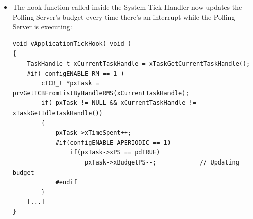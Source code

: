 \documentclass[10pt]{article}
\begin{document}
\begin{itemize}
\item The hook function called inside the System Tick Handler now updates the Polling Server's budget every time there's an interrupt while the Polling Server is executing:
\begin{lstlisting}
void vApplicationTickHook( void )
{
    TaskHandle_t xCurrentTaskHandle = xTaskGetCurrentTaskHandle();
    #if( configENABLE_RM == 1 )
        cTCB_t *pxTask = prvGetTCBFromListByHandleRMS(xCurrentTaskHandle);
        if( pxTask != NULL && xCurrentTaskHandle != xTaskGetIdleTaskHandle())
        {
            pxTask->xTimeSpent++;
            #if(configENABLE_APERIODIC == 1)
                if(pxTask->xPS == pdTRUE)
                    pxTask->xBudgetPS--;			// Updating budget
            #endif
        }
    [...]
}
\end{lstlisting}
\end{itemize}
\end{document}
